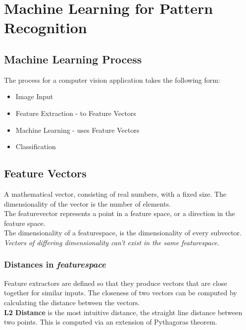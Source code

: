 \section{Machine Learning for Pattern Recognition}

\subsection{Machine Learning Process}
The process for a computer vision application takes the following form:

\begin{itemize}
    \item Image Input
    \item Feature Extraction - to Feature Vectors
    \item Machine Learning - uses Feature Vectors
    \item Classification
\end{itemize}

\subsection{Feature Vectors}
A mathematical vector, consisting of real numbers, with a fixed size. The dimensionality of the vector is the number of elements. \\

\noindent The featurevector represents a point in a feature space, or a direction in the feature space.
\\

\noindent The dimensionality of a featurespace, is the dimensionality of every subvector.
\\

\noindent \textit{Vectors of differing dimensionality can't exist in the same featurespace.}

\subsubsection{Distances in \textit{featurespace}}
Feature extractors are defined so that they produce vectors that are close together for similar inputs. The closeness of two vectors can be computed by calculating the distance between the vectors.
\\

\noindent \textbf{L2 Distance} is the most intuitive distance, the straight line distance between two points. This is computed via an extension of Pythagoras theorem.

